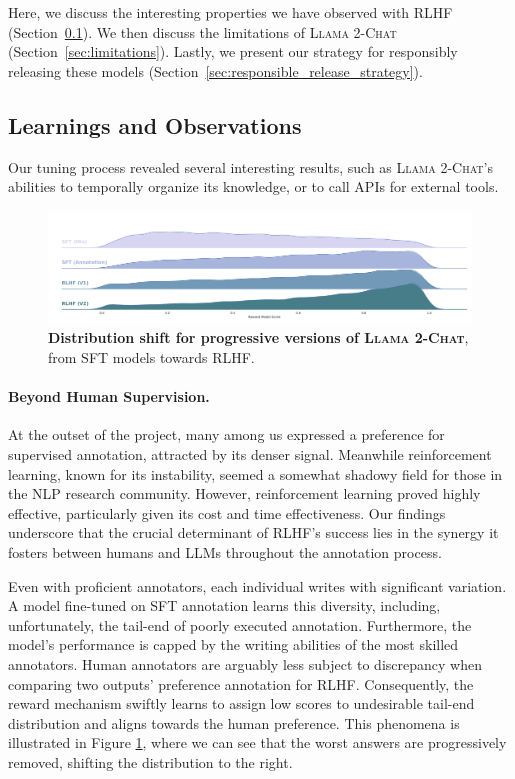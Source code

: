 \documentclass{article}
\newcommand{\modelname}{\textsc{Llama 2-Chat}\xspace}
\begin{document}
Here, we discuss the interesting properties we have observed with RLHF (Section~\ref{sec:rlhf_dark_magic}). We then discuss the limitations of \modelname{} (Section~\ref{sec:limitations}). Lastly, we present our strategy for responsibly releasing these models (Section~\ref{sec:responsible_release_strategy}).

\subsection{Learnings and Observations}
\label{sec:rlhf_dark_magic}

Our tuning process revealed several interesting results, such as \modelname{}'s abilities to temporally organize its knowledge, or to call APIs for external tools.


\begin{figure}[!htbp]
    \centering
    \includegraphics[width=\linewidth]{img/rlhf_shift_distrib.pdf}
    \caption{\textbf{Distribution shift for progressive versions of \modelname{}}, from SFT models towards RLHF.
    }
\label{fig:rlhf_shift_distrib}
\end{figure}

\paragraph{Beyond Human Supervision.}
At the outset of the project, many among us expressed a preference for supervised annotation, attracted by its denser signal. Meanwhile reinforcement learning, known for its instability, seemed a somewhat shadowy field for those in the NLP research community. However, reinforcement learning proved highly effective, particularly given its cost and time effectiveness. Our findings underscore that the crucial determinant of RLHF's success lies in the synergy it fosters between humans and LLMs throughout the annotation process.

Even with proficient annotators, each individual writes with significant variation. A model fine-tuned on SFT annotation learns this diversity, including, unfortunately, the tail-end of poorly executed annotation. Furthermore, the model's performance is capped by the writing abilities of the most skilled annotators. Human annotators are arguably less subject to discrepancy when comparing two outputs' preference annotation for RLHF. Consequently, the reward mechanism swiftly learns to assign low scores to undesirable tail-end distribution and aligns towards the human preference. This phenomena is illustrated in Figure \ref{fig:rlhf_shift_distrib}, where we can see that the worst answers are progressively removed, shifting the distribution to the right.
\end{document}
